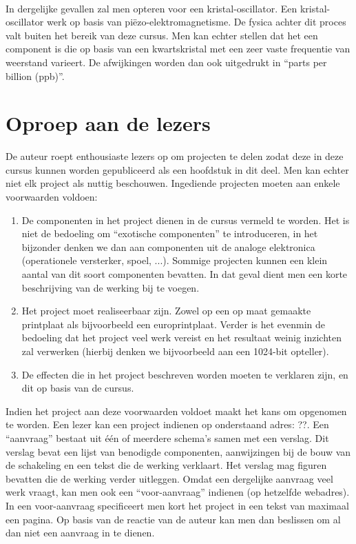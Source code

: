 \paragraph{}
In dergelijke gevallen zal men opteren voor een kristal-oscillator. Een kristal-oscillator werk op basis van pi\"ezo-elektromagnetisme. De fysica achter dit proces valt buiten het bereik van deze cursus. Men kan echter stellen dat het een component is die op basis van een kwartskristal met een zeer vaste frequentie van weerstand varieert. De afwijkingen worden dan ook uitgedrukt in ``parts per billion (ppb)''.
\section{Oproep aan de lezers}
De auteur roept enthousiaste lezers op om projecten te delen zodat deze in deze cursus kunnen worden gepubliceerd als een hoofdstuk in dit deel. Men kan echter niet elk project als nuttig beschouwen. Ingediende projecten moeten aan enkele voorwaarden voldoen:
\begin{enumerate}
 \item De componenten in het project dienen in de cursus vermeld te worden. Het is niet de bedoeling om ``exotische componenten'' te introduceren, in het bijzonder denken we dan aan componenten uit de analoge elektronica (operationele versterker, spoel, ...). Sommige projecten kunnen een klein aantal van dit soort componenten bevatten. In dat geval dient men een korte beschrijving van de werking bij te voegen.
 \item Het project moet realiseerbaar zijn. Zowel op een op maat gemaakte printplaat als bijvoorbeeld een europrintplaat. Verder is het evenmin de bedoeling dat het project veel werk vereist en het resultaat weinig inzichten zal verwerken (hierbij denken we bijvoorbeeld aan een 1024-bit opteller).
 \item De effecten die in het project beschreven worden moeten te verklaren zijn, en dit op basis van de cursus.
\end{enumerate}
Indien het project aan deze voorwaarden voldoet maakt het kans om opgenomen te worden. Een lezer kan een project indienen op onderstaand adres: ??. Een ``aanvraag'' bestaat uit \'e\'en of meerdere schema's samen met een verslag. Dit verslag bevat een lijst van benodigde componenten, aanwijzingen bij de bouw van de schakeling en een tekst die de werking verklaart. Het verslag mag figuren bevatten die de werking verder uitleggen. Omdat een dergelijke aanvraag veel werk vraagt, kan men ook een ``voor-aanvraag'' indienen (op hetzelfde webadres). In een voor-aanvraag specificeert men kort het project in een tekst van maximaal een pagina. Op basis van de reactie van de auteur kan men dan beslissen om al dan niet een aanvraag in te dienen.